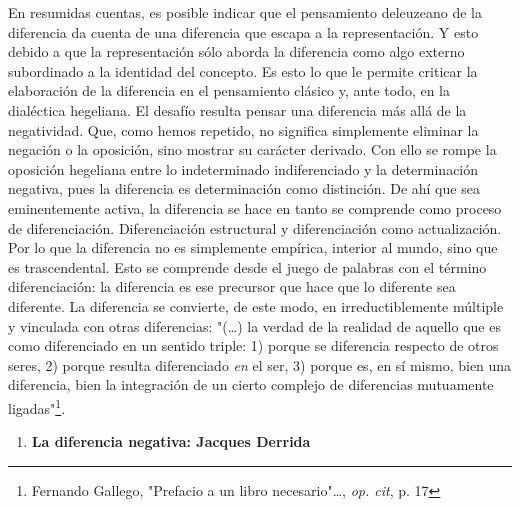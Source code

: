 \documentclass{book}
\begin{document}
En resumidas cuentas, es posible indicar que el pensamiento deleuzeano
de la diferencia da cuenta de una diferencia que escapa a la
representación. Y esto debido a que la representación sólo aborda la
diferencia como algo externo subordinado a la identidad del concepto. Es
esto lo que le permite criticar la elaboración de la diferencia en el
pensamiento clásico y, ante todo, en la dialéctica hegeliana. El desafío
resulta pensar una diferencia más allá de la negatividad. Que, como
hemos repetido, no significa simplemente eliminar la negación o la
oposición, sino mostrar su carácter derivado. Con ello se rompe la
oposición hegeliana entre lo indeterminado indiferenciado y la
determinación negativa, pues la diferencia es determinación como
distinción. De ahí que sea eminentemente activa, la diferencia se hace
en tanto se comprende como proceso de diferenciación. Diferenciación
estructural y diferenciación como actualización. Por lo que la
diferencia no es simplemente empírica, interior al mundo, sino que es
trascendental. Esto se comprende desde el juego de palabras con el
término diferenciación: la diferencia es ese precursor que hace que lo
diferente sea diferente. La diferencia se convierte, de este modo, en
irreductiblemente múltiple y vinculada con otras diferencias:
"(\dots) la verdad de la realidad de aquello que es como
diferenciado en un sentido triple: 1) porque se diferencia respecto de
otros seres, 2) porque resulta diferenciado \emph{en} el ser, 3) porque
es, en sí mismo, bien una diferencia, bien la integración de un cierto
complejo de diferencias mutuamente ligadas"\footnote{Fernando Gallego,
  "Prefacio a un libro necesario"\ldots, \emph{op. cit}, p. 17}.

\begin{enumerate}
\def\labelenumi{\arabic{enumi}.}
\setcounter{enumi}{3}
\item
  \textbf{La diferencia negativa: Jacques Derrida}
\end{enumerate}
\end{document}
